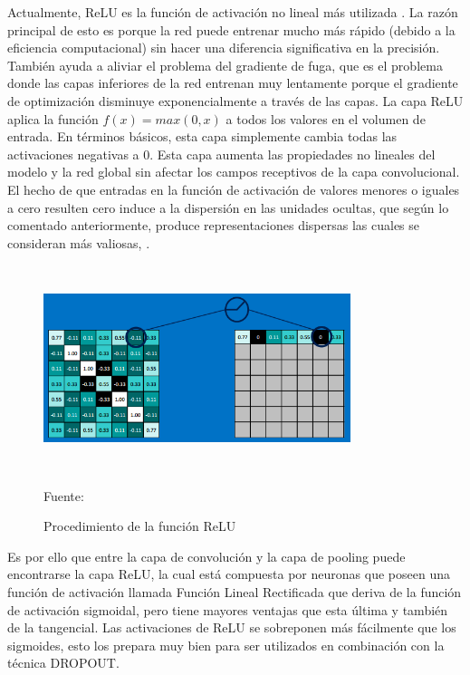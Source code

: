 		Actualmente, ReLU es la función de activación no lineal más utilizada \citep{cs231n}. La razón principal de esto es porque la red puede entrenar mucho más rápido (debido a la eficiencia computacional) sin hacer una diferencia significativa en la precisión. También ayuda a aliviar el problema del gradiente de fuga, que es el problema donde las capas inferiores de la red entrenan muy lentamente porque el gradiente de optimización	disminuye exponencialmente a través de las capas. La capa ReLU aplica la función ${f(x)} = {max (0, x)} $ a todos los valores en el volumen de entrada. En términos básicos, esta capa simplemente cambia todas las activaciones negativas a 0. Esta capa aumenta las propiedades no lineales del modelo y la red global sin afectar los campos receptivos de la capa convolucional. El hecho de que entradas en la función de activación de valores menores o iguales a cero resulten cero induce a la dispersión en las unidades ocultas, que según lo comentado anteriormente, produce representaciones dispersas las cuales se consideran más valiosas, \citep{RELU}. 
		
		\begin{figure}[H]
		\begin{center}
		\includegraphics[width=0.8\textwidth, height=6cm]{images/marcoteorico/relu}
		\end{center}
		\begin{center}
		\caption{\small{Procedimiento de la función ReLU}}
		\vskip -0.2cm  
		{\small{Fuente: \cite{Rohrer}}}
		\end{center}
		\vspace{-1.5em}
		\end{figure}
		\vskip 0.4cm
		
		Es por ello que entre la capa de convolución y la capa de pooling puede encontrarse la capa ReLU, la cual está compuesta por neuronas que poseen una función de activación llamada Función Lineal Rectificada que deriva de la función de activación sigmoidal, pero tiene mayores ventajas que esta última y también de la tangencial. Las activaciones de ReLU se sobreponen más fácilmente que los sigmoides, esto los prepara muy bien para ser utilizados en combinación con la técnica DROPOUT.
		
